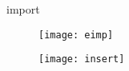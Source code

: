 \begin{frame}{import}
	\begin{figure}
		\centering\texttt{[image: eimp]}
	\end{figure}
	\vspace{-1cm}
	\begin{figure}
		\centering\texttt{[image: insert]}
	\end{figure}
\end{frame}